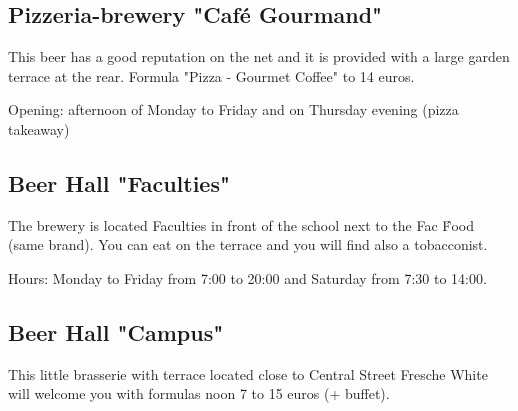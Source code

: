 

\subsection{Pizzeria-brewery "Café Gourmand"}

This beer has a good reputation on the net and it is provided with a large garden terrace at the rear.
Formula "Pizza - Gourmet Coffee" to 14 euros.

Opening: afternoon of Monday to Friday and on Thursday evening (pizza takeaway)



\subsection {Beer Hall "Faculties"}
The brewery is located Faculties in front of the school next to the Fac \'Food (same brand).
You can eat on the terrace and you will find also a tobacconist.

Hours: Monday to Friday from 7:00 to 20:00 and Saturday from 7:30 to 14:00.



\subsection {Beer Hall "Campus"}
This little brasserie with terrace located close to Central Street Fresche White will welcome you with formulas noon 7 to 15 euros (+ buffet).

